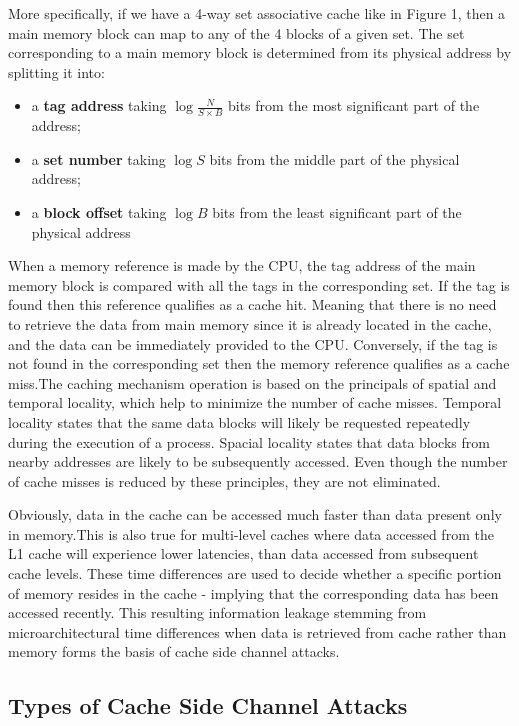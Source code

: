 \documentclass[twocolumn]{IEEEtran}
\begin{document}
More specifically, if we have a 4-way set associative cache like in Figure 1, then a main memory block can map to any of the 4 blocks of a given set. The set corresponding to a main memory block is determined from its physical address by splitting it into:

\begin {itemize}
\item a \textbf{tag address} taking $\log \frac{N}{S\times B}$  bits from the most significant part of the address;
\item a \textbf{set number} taking $\log {S}$ bits from the middle part of the physical address;
\item a\textbf{ block offset} taking $\log {B}$ bits from the least significant part of the physical address
\end{itemize}


When a memory reference is made by the CPU, the tag address of the main memory block is compared with all the tags in the corresponding set. If the tag is found then this reference qualifies as a cache hit. Meaning that there is no need to retrieve the data from main memory since it is already located in the cache, and the data can be immediately provided to the CPU. Conversely, if the tag is not found in the corresponding set then the memory reference qualifies as a cache miss.The caching mechanism operation is based on the principals of spatial and temporal locality, which help to minimize the number of
cache misses. Temporal locality states that the same data blocks will likely be requested repeatedly during the execution of a process. Spacial locality states that data blocks from nearby addresses are likely to be subsequently accessed. Even though the number of cache misses is reduced by these principles, they are not eliminated.

Obviously, data in the cache can be accessed much faster than data present only in memory.This is also true for multi-level caches where data accessed from the L1 cache will experience lower latencies, than data accessed from subsequent cache levels. These time differences are used to decide whether a specific portion of memory resides in the cache - implying that the corresponding data has been accessed recently. This resulting information leakage stemming from microarchitectural time differences when data is retrieved from cache rather than memory forms the basis of cache side channel attacks.

\subsection { Types of Cache Side Channel Attacks }
\end{document}
